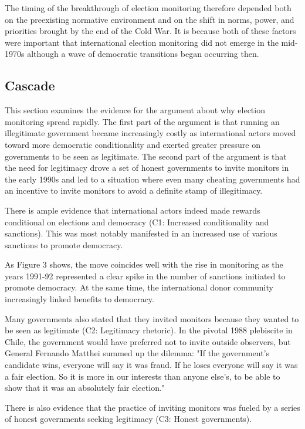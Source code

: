 The timing of the breakthrough of election monitoring therefore depended both on the preexisting normative environment and on the shift in norms, power, and priorities brought by the end of the Cold War. It is because both of these factors were important that international election monitoring did not emerge in the mid-1970s although a wave of democratic transitions began occurring then.

\subsection{Cascade}
This section examines the evidence for the argument about why election monitoring spread rapidly. The first part of the argument is that running an illegitimate government became increasingly costly as international actors moved toward more democratic conditionality and exerted greater pressure on governments to be seen as legitimate. The second part of the argument is that the need for legitimacy drove a set of honest governments to invite monitors in the early 1990s and led to a situation where even many cheating governments had an incentive to invite monitors to avoid a definite stamp of illegitimacy.

There is ample evidence that international actors indeed made rewards conditional on elections and democracy (C1: Increased conditionality and sanctions). This was most notably manifested in an increased use of various sanctions to promote democracy.

As Figure 3 shows, the move coincides well with the rise in monitoring as the years 1991-92 represented a clear spike in the number of sanctions initiated to promote democracy. At the same time, the international donor community increasingly linked benefits to democracy.

Many governments also stated that they invited monitors because they wanted to be seen as legitimate (C2: Legitimacy rhetoric). In the pivotal 1988 plebiscite in Chile, the government would have preferred not to invite outside observers, but General Fernando Matthei summed up the dilemma: "If the government's candidate wins, everyone will say it was fraud. If he loses everyone will say it was a fair election. So it is more in our interests than anyone else's, to be able to show that it was an absolutely fair election."

There is also evidence that the practice of inviting monitors was fueled by a series of honest governments seeking legitimacy (C3: Honest governments).

